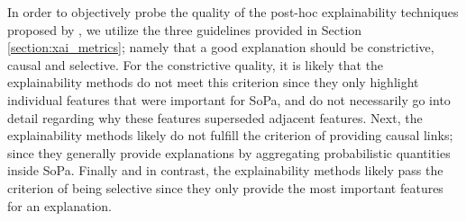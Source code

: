 In order to objectively probe the quality of the post-hoc explainability
techniques proposed by \citet{schwartz2018sopa}, we utilize the three guidelines
provided in Section \ref{section:xai_metrics}; namely that a good explanation
should be constrictive, causal and selective. For the constrictive quality, it
is likely that the explainability methods do not meet this criterion since they
only highlight individual features that were important for SoPa, and do not
necessarily go into detail regarding why these features superseded adjacent
features. Next, the explainability methods likely do not fulfill the criterion
of providing causal links; since they generally provide explanations by
aggregating probabilistic quantities inside SoPa. Finally and in
contrast, the explainability methods likely pass the criterion of being
selective since they only provide the most important features for an
explanation.


